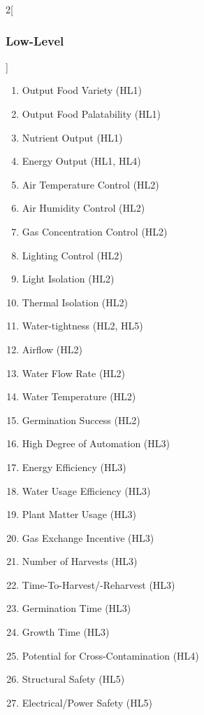 \documentclass{report}
\begin{document}
\begin{multicols}{2}[\subsubsection{Low-Level}\label{sec:llos}]
    \begin{enumerate}
        \item Output Food Variety \hfill (HL1)
        \item Output Food Palatability \hfill (HL1)
        \item Nutrient Output \hfill (HL1)
        \item Energy Output \hfill (HL1, HL4)
        \item Air Temperature Control \hfill (HL2)
        \item Air Humidity Control \hfill (HL2)
        \item Gas Concentration Control \hfill (HL2)
        \item Lighting Control \hfill (HL2)
        \item Light Isolation \hfill (HL2)
        \item Thermal Isolation \hfill (HL2)
        \item Water-tightness \hfill (HL2, HL5)
        \item Airflow \hfill (HL2)
        \item Water Flow Rate \hfill (HL2)
        \item Water Temperature \hfill (HL2)
        \item Germination Success \hfill (HL2)
        \item High Degree of Automation \hfill (HL3)
        \item Energy Efficiency \hfill (HL3)
        \item Water Usage Efficiency \hfill (HL3)
        \item Plant Matter Usage \hfill (HL3)
        \item Gas Exchange Incentive \hfill (HL3)
        \item Number of Harvests \hfill (HL3)
        \item Time-To-Harvest/-Reharvest \hfill (HL3)
        \item Germination Time \hfill (HL3)
        \item Growth Time \hfill (HL3)
        \item Potential for Cross-Contamination \hfill (HL4)
        \item Structural Safety \hfill (HL5)
        \item Electrical/Power Safety \hfill (HL5)

\end{enumerate}
\end{multicols}
\end{document}
